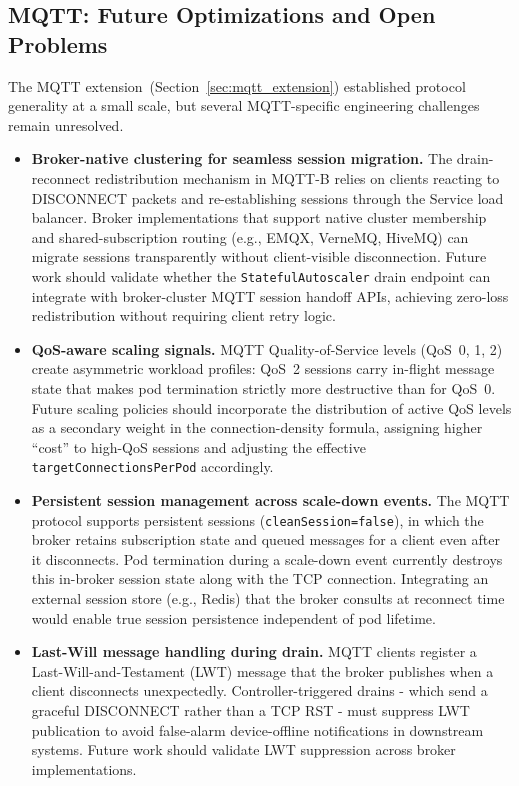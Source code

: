 \documentclass[twocolumn]{svjour3}
\begin{document}
\subsection{MQTT: Future Optimizations and Open Problems}

The MQTT extension~(Section~\ref{sec:mqtt_extension}) established protocol generality at a small scale, but several MQTT-specific engineering challenges remain unresolved.

\begin{itemize}[leftmargin=*]
  \item \textbf{Broker-native clustering for seamless session migration.} The drain-reconnect redistribution mechanism in MQTT-B relies on clients reacting to DISCONNECT packets and re-establishing sessions through the Service load balancer. Broker implementations that support native cluster membership and shared-subscription routing (e.g., EMQX, VerneMQ, HiveMQ) can migrate sessions transparently without client-visible disconnection. Future work should validate whether the \texttt{StatefulAutoscaler} drain endpoint can integrate with broker-cluster MQTT session handoff APIs, achieving zero-loss redistribution without requiring client retry logic.

  \item \textbf{QoS-aware scaling signals.} MQTT Quality-of-Service levels (QoS~0, 1, 2) create asymmetric workload profiles: QoS~2 sessions carry in-flight message state that makes pod termination strictly more destructive than for QoS~0. Future scaling policies should incorporate the distribution of active QoS levels as a secondary weight in the connection-density formula, assigning higher ``cost'' to high-QoS sessions and adjusting the effective \texttt{targetConnectionsPerPod} accordingly.

  \item \textbf{Persistent session management across scale-down events.} The MQTT protocol supports persistent sessions (\texttt{cleanSession=false}), in which the broker retains subscription state and queued messages for a client even after it disconnects. Pod termination during a scale-down event currently destroys this in-broker session state along with the TCP connection. Integrating an external session store (e.g., Redis) that the broker consults at reconnect time would enable true session persistence independent of pod lifetime.

  \item \textbf{Last-Will message handling during drain.} MQTT clients register a Last-Will-and-Testament (LWT) message that the broker publishes when a client disconnects unexpectedly. Controller-triggered drains - which send a graceful DISCONNECT rather than a TCP RST - must suppress LWT publication to avoid false-alarm device-offline notifications in downstream systems. Future work should validate LWT suppression across broker implementations.


\end{itemize}
\end{document}

